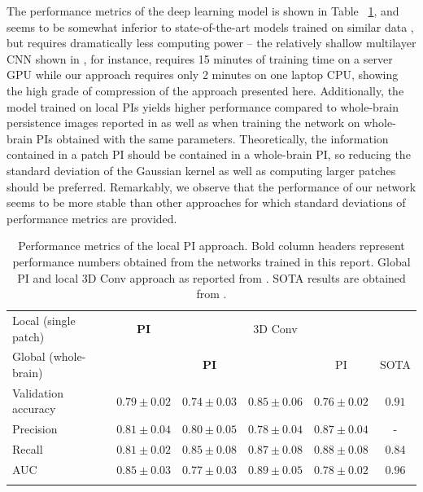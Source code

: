 \documentclass{article}
\begin{document}
The performance metrics of the deep learning model is shown in Table ~\ref{tab:performance}, and
seems to be somewhat inferior to state-of-the-art models trained on similar data
\citep{wen2020convolutional}, but requires dramatically less computing power -- the relatively
shallow multilayer CNN shown in \citet{bruningk2020image}, for instance, requires 15 minutes of
training time on a server GPU while our approach requires only 2 minutes on one laptop CPU, showing
the high grade of compression of the approach presented here. Additionally, the model trained on
local PIs yields higher performance compared to whole-brain persistence images reported in
\citep{bruningk2020image} as well as when training the network on whole-brain PIs obtained with the
same parameters. Theoretically, the information contained in a patch PI should be contained in a
whole-brain PI, so reducing the standard deviation of the Gaussian kernel as well as computing
larger patches should be preferred. Remarkably, we observe that the performance of our network seems
to be more stable than other approaches for which standard deviations of performance metrics are
provided.

\begin{table}
  \centering
  \begin{tabular}{lccccc}
    \toprule
    Local (single patch) & \textbf{PI} & & 3D Conv & & \\
    Global (whole-brain) &&\textbf{PI}& & PI & SOTA \\ \midrule Validation
    accuracy & $0.79\pm 0.02$ & $0.74\pm 0.03$ & $0.85\pm 0.06$ & $ 0.76\pm 0.02$ & $0.91$\\
    Precision & $0.81\pm 0.04$ & $0.80\pm0.05$ &  $0.78\pm 0.04$ & $0.87\pm0.04$ & - \\
    Recall & $0.81\pm 0.02$ & $0.85\pm0.08$ & $0.87\pm0.08$ & $0.88\pm 0.08$ &$0.84$\\
    AUC & $0.85\pm 0.03$ & $0.77\pm0.03$ & $0.89\pm0.05$ & $ 0.78\pm 0.02$ & $0.96$\\
    \bottomrule
    \vspace{1pt}
  \end{tabular}
  \caption{Performance metrics of the local PI approach. Bold column headers represent performance
    numbers obtained from the networks trained in this report. Global PI and local 3D Conv approach as reported from
    \citet{bruningk2020image}. SOTA results are obtained from \citet{liu2018anatomical}.}
  \label{tab:performance}
\end{table}
\end{document}
